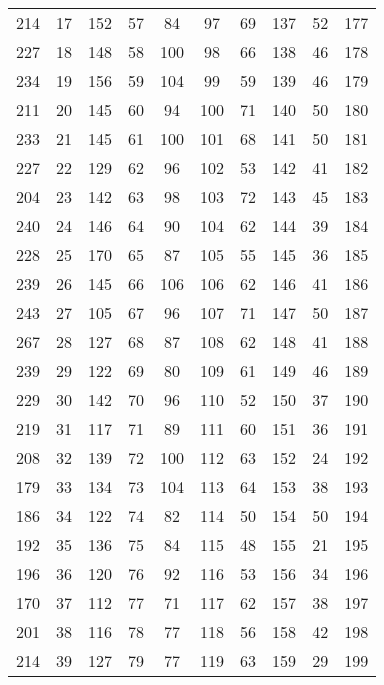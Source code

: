 \begin{table}
\begin{tabular}{c c || c c || c c || c c || c c}
214      &   17    &152      &   57&84      &    97  &69      &137 & 52     & 177  \\
227      &   18    &148      &   58&100     &    98  &66      &138 & 46     & 178  \\
234      &   19    &156      &   59&104     &    99  &59      &139 & 46     & 179  \\
211      &   20    &145      &   60&94      &    100 &71      &140 & 50     & 180  \\
233      &   21    &145      &   61&100     &    101 &68      &141 & 50     & 181  \\
227      &   22    &129      &   62&96      &    102 &53      &142 & 41     & 182  \\
204      &   23    &142      &   63&98      &    103 &72      &143 & 45     & 183  \\
240      &   24    &146      &   64&90      &    104 &62      &144 & 39     & 184  \\
228      &   25    &170      &   65&87      &    105 &55      &145 & 36     & 185  \\
239      &   26    &145      &   66&106     &    106 &62      &146 & 41     & 186  \\
243      &   27    &105      &   67&96      &    107 &71      &147 & 50     & 187  \\
267      &   28    &127      &   68&87      &    108 &62      &148 & 41     & 188  \\
239      &   29    &122      &   69&80      &    109 &61      &149 & 46     & 189  \\
229      &   30    &142      &   70&96      &    110 &52      &150 & 37     & 190  \\
219      &   31    &117      &   71&89      &    111 &60      &151 & 36     & 191  \\
208      &   32    &139      &   72&100     &    112 &63      &152 & 24     & 192  \\
179      &   33    &134      &   73&104     &    113 &64      &153 & 38     & 193  \\
186      &   34    &122      &   74&82      &    114 &50      &154 & 50     & 194  \\
192      &   35    &136      &   75&84      &    115 &48      &155 & 21     & 195  \\
196      &   36    &120      &   76&92      &    116 &53      &156 & 34     & 196  \\
170      &   37    &112      &   77&71      &    117 &62      &157 & 38     & 197  \\
201      &   38    &116      &   78&77      &    118 &56      &158 & 42     & 198  \\
214      &   39    &127      &   79&77      &    119 &63      &159 & 29    &  199 \\

    \end{tabular}
\end{table}
 


